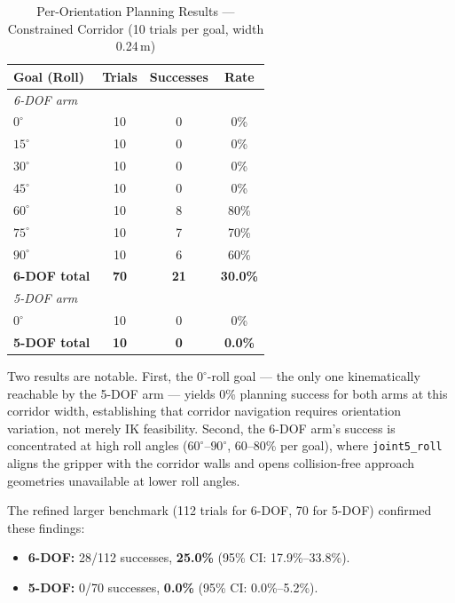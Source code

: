 \documentclass[conference]{IEEEtran}
\begin{document}
	\begin{table}[t]
		\centering
		\caption{Per-Orientation Planning Results --- Constrained Corridor
			(10 trials per goal, width 0.24\,m)}
		\label{tab:planning_detail}
		\renewcommand{\arraystretch}{1.2}
		\small
		\begin{tabular}{lccc}
			\toprule
			\textbf{Goal (Roll)} & \textbf{Trials} & \textbf{Successes} & \textbf{Rate} \\
			\midrule
			\multicolumn{4}{l}{\textit{6-DOF arm}} \\
			$0^\circ$  & 10 & 0 &  0\%  \\
			$15^\circ$ & 10 & 0 &  0\%  \\
			$30^\circ$ & 10 & 0 &  0\%  \\
			$45^\circ$ & 10 & 0 &  0\%  \\
			$60^\circ$ & 10 & 8 & 80\%  \\
			$75^\circ$ & 10 & 7 & 70\%  \\
			$90^\circ$ & 10 & 6 & 60\%  \\
			\midrule
			\textbf{6-DOF total} & \textbf{70} & \textbf{21} & \textbf{30.0\%} \\
			\midrule
			\multicolumn{4}{l}{\textit{5-DOF arm}} \\
			$0^\circ$  & 10 & 0 &  0\%  \\
			\midrule
			\textbf{5-DOF total} & \textbf{10} & \textbf{0} & \textbf{0.0\%}  \\
			\bottomrule
		\end{tabular}
	\end{table}
	
	Two results are notable. First, the $0^\circ$-roll goal --- the only
	one kinematically reachable by the 5-DOF arm --- yields 0\% planning
	success for both arms at this corridor width, establishing that
	corridor navigation requires orientation variation, not merely IK
	feasibility. Second, the 6-DOF arm's success is concentrated at high
	roll angles ($60^\circ$--$90^\circ$, 60--80\% per goal), where
	\texttt{joint5\_roll} aligns the gripper with the corridor walls and
	opens collision-free approach geometries unavailable at lower roll
	angles.
	
	The refined larger benchmark (112 trials for 6-DOF, 70 for 5-DOF)
	confirmed these findings:
	\begin{itemize}
		\item \textbf{6-DOF:} 28/112 successes, \textbf{25.0\%}
		(95\% CI: 17.9\%--33.8\%).
		\item \textbf{5-DOF:} 0/70 successes, \textbf{0.0\%}
		(95\% CI: 0.0\%--5.2\%).
	\end{itemize}
	
\end{document}
